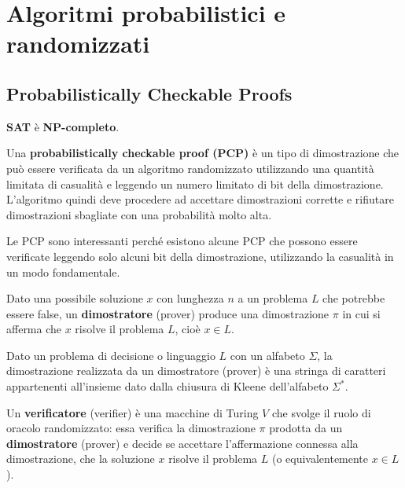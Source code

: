 \documentclass[\main/main.tex]{subfiles}
\begin{document}
\chapter{Algoritmi probabilistici e randomizzati}
\section{Probabilistically Checkable Proofs}
\begin{multicols}{2}
\begin{theorem}
    \textbf{SAT} è \textbf{NP-completo}.
\end{theorem}
\begin{definition}
    Una \textbf{probabilistically checkable proof (PCP)} è un tipo di dimostrazione che può essere verificata da un algoritmo randomizzato utilizzando una quantità limitata di casualità e leggendo un numero limitato di bit della dimostrazione. L'algoritmo quindi deve procedere ad accettare dimostrazioni corrette e rifiutare dimostrazioni sbagliate con una probabilità molto alta.
\end{definition}
\begin{observation}
    Le PCP sono interessanti perché esistono alcune PCP che possono essere verificate leggendo solo alcuni bit della dimostrazione, utilizzando la casualità in un modo fondamentale.
\end{observation}
\begin{definition}
    Dato una possibile soluzione \(x\) con lunghezza \(n\) a un problema \(L\) che potrebbe essere false, un \textbf{dimostratore} (prover) produce una dimostrazione \(\pi\) in cui si afferma che \(x\) risolve il problema \(L\), cioè \(x \in L\).
\end{definition}
\begin{observation}
    Dato un problema di decisione o linguaggio \(L\) con un alfabeto \(\Sigma\), la dimostrazione realizzata da un dimostratore (prover) è una stringa di caratteri appartenenti all'insieme dato dalla chiusura di Kleene dell'alfabeto \(\Sigma^*\).
\end{observation}
\begin{definition}
    Un \textbf{verificatore} (verifier) è una macchine di Turing \(V\) che svolge il ruolo di oracolo randomizzato: essa verifica la dimostrazione \(\pi\) prodotta da un \textbf{dimostratore} (prover) e decide se accettare l'affermazione connessa alla dimostrazione, che la soluzione \(x\) risolve il problema \(L\) (o equivalentemente \(x \in L\)). 
    

\end{definition}
\end{multicols}
\end{document}
